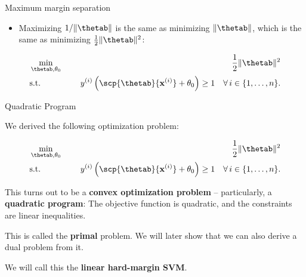 \documentclass[11pt,compress,t,notes=noshow, xcolor=table]{beamer}
\begin{document}
\begin{vbframe}{Maximum margin separation}
 \begin{itemize}
  \item Maximizing $1 / \|\thetab\|$ is the same as minimizing $\|\thetab\|$, which is the same as minimizing $\frac{1}{2}\|\thetab\|^2$:
  \end{itemize}

\begin{eqnarray*}
  & \min\limits_{\thetab, \theta_0} \quad & \frac{1}{2} \|\thetab\|^2 \\
   & \text{s.t.} & \,\,\yi  \left( \scp{\thetab}{\xi} + \theta_0 \right) \geq 1 \quad \forall\, i \in \nset.
\end{eqnarray*}

\end{vbframe}

\begin{vbframe}{Quadratic Program}

We derived the following optimization problem:

  \begin{eqnarray*}
  & \min\limits_{\thetab, \theta_0} \quad & \frac{1}{2} \|\thetab\|^2 \\
  & \text{s.t.} & \,\,\yi  \left( \scp{\thetab}{\xi} + \theta_0 \right) \geq 1 \quad \forall\, i \in \nset.
\end{eqnarray*}

This turns out to be a \textbf{convex optimization problem} -- particularly, a \textbf{quadratic program}: The objective function is quadratic, and the constraints are linear inequalities.

\lz

This is called the \textbf{primal} problem. We will later show that we can also derive a dual problem from it.

\lz

We will call this the \textbf{linear hard-margin SVM}.
\end{vbframe}
\end{document}
